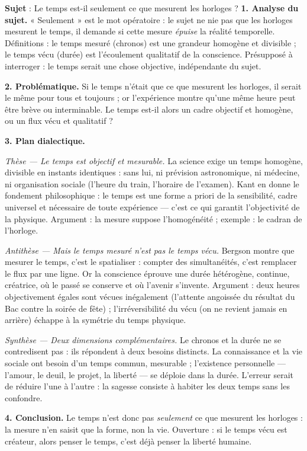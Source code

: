 \documentclass[11pt]{article}
\begin{document}
\begin{exoresolu}
\textbf{Sujet} : Le temps est-il seulement ce que mesurent les horloges ?
\tcblower
\textbf{1. Analyse du sujet.} « Seulement » est le mot opératoire : le sujet ne nie pas que les horloges mesurent le temps, il demande si cette mesure \emph{épuise} la réalité temporelle. Définitions : le temps mesuré (chronos) est une grandeur homogène et divisible ; le temps vécu (durée) est l'écoulement qualitatif de la conscience. Présupposé à interroger : le temps serait une chose objective, indépendante du sujet.

\textbf{2. Problématique.} Si le temps n'était que ce que mesurent les horloges, il serait le même pour tous et toujours ; or l'expérience montre qu'une même heure peut être brève ou interminable. Le temps est-il alors un cadre objectif et homogène, ou un flux vécu et qualitatif ?

\textbf{3. Plan dialectique.}

\emph{Thèse — Le temps est objectif et mesurable.} La science exige un temps homogène, divisible en instants identiques : sans lui, ni prévision astronomique, ni médecine, ni organisation sociale (l'heure du train, l'horaire de l'examen). Kant en donne le fondement philosophique : le temps est une forme a priori de la sensibilité, cadre universel et nécessaire de toute expérience — c'est ce qui garantit l'objectivité de la physique. Argument : la mesure suppose l'homogénéité ; exemple : le cadran de l'horloge.

\emph{Antithèse — Mais le temps mesuré n'est pas le temps vécu.} Bergson montre que mesurer le temps, c'est le spatialiser : compter des simultanéités, c'est remplacer le flux par une ligne. Or la conscience éprouve une durée hétérogène, continue, créatrice, où le passé se conserve et où l'avenir s'invente. Argument : deux heures objectivement égales sont vécues inégalement (l'attente angoissée du résultat du Bac contre la soirée de fête) ; l'irréversibilité du vécu (on ne revient jamais en arrière) échappe à la symétrie du temps physique.

\emph{Synthèse — Deux dimensions complémentaires.} Le chronos et la durée ne se contredisent pas : ils répondent à deux besoins distincts. La connaissance et la vie sociale ont besoin d'un temps commun, mesurable ; l'existence personnelle — l'amour, le deuil, le projet, la liberté — se déploie dans la durée. L'erreur serait de réduire l'une à l'autre : la sagesse consiste à habiter les deux temps sans les confondre.

\textbf{4. Conclusion.} Le temps n'est donc pas \emph{seulement} ce que mesurent les horloges : la mesure n'en saisit que la forme, non la vie. Ouverture : si le temps vécu est créateur, alors penser le temps, c'est déjà penser la liberté humaine.
\end{exoresolu}
\end{document}

